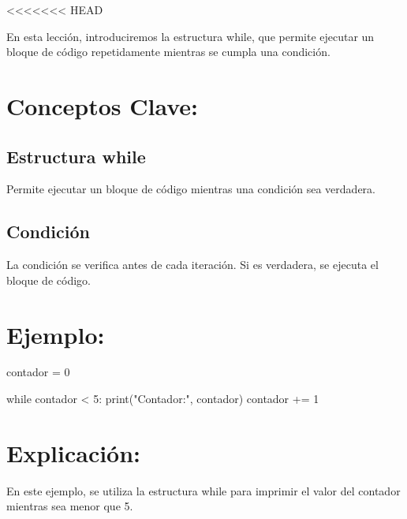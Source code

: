 \documentclass[
  a4paper,
  DIV=11,
  numbers=noendperiod,
  onepage,
  openany]{scrreprt}
\newenvironment{Shaded}{\begin{snugshade}}{\end{snugshade}}
\newcommand{\BuiltInTok}[1]{\textcolor[rgb]{0.00,0.23,0.31}{#1}}
\newcommand{\ControlFlowTok}[1]{\textcolor[rgb]{0.00,0.23,0.31}{#1}}
\newcommand{\DecValTok}[1]{\textcolor[rgb]{0.68,0.00,0.00}{#1}}
\newcommand{\NormalTok}[1]{\textcolor[rgb]{0.00,0.23,0.31}{#1}}
\newcommand{\OperatorTok}[1]{\textcolor[rgb]{0.37,0.37,0.37}{#1}}
\newcommand{\StringTok}[1]{\textcolor[rgb]{0.13,0.47,0.30}{#1}}
\begin{document}
\textless\textless\textless\textless\textless\textless\textless{} HEAD

En esta lección, introduciremos la estructura while, que permite
ejecutar un bloque de código repetidamente mientras se cumpla una
condición.

\hypertarget{conceptos-clave-36}{%
\section{Conceptos Clave:}\label{conceptos-clave-36}}

\hypertarget{estructura-while}{%
\subsection{Estructura while}\label{estructura-while}}

Permite ejecutar un bloque de código mientras una condición sea
verdadera.

\hypertarget{condiciuxf3n}{%
\subsection{Condición}\label{condiciuxf3n}}

La condición se verifica antes de cada iteración. Si es verdadera, se
ejecuta el bloque de código.

\hypertarget{ejemplo-36}{%
\section{Ejemplo:}\label{ejemplo-36}}

\begin{Shaded}
\begin{Highlighting}[]
\NormalTok{contador }\OperatorTok{=} \DecValTok{0}

\ControlFlowTok{while}\NormalTok{ contador }\OperatorTok{\textless{}} \DecValTok{5}\NormalTok{:}
    \BuiltInTok{print}\NormalTok{(}\StringTok{"Contador:"}\NormalTok{, contador)}
\NormalTok{    contador }\OperatorTok{+=} \DecValTok{1}
\end{Highlighting}
\end{Shaded}

\hypertarget{explicaciuxf3n-36}{%
\section{Explicación:}\label{explicaciuxf3n-36}}

En este ejemplo, se utiliza la estructura while para imprimir el valor
del contador mientras sea menor que 5.
\end{document}
